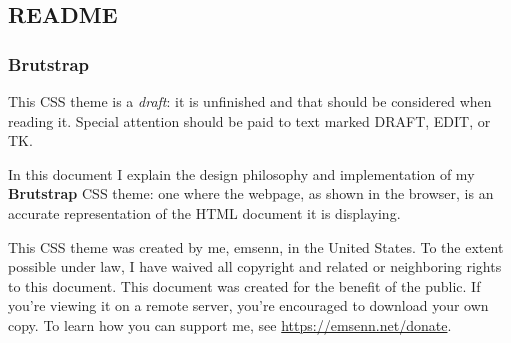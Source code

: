 \documentclass[11pt]{article}
\begin{document}
\subsection*{README}
\label{sec:orge122f29}
\subsubsection*{Brutstrap}
\label{sec:org79aa432}
This CSS theme is a \emph{draft}: it is unfinished and that should be considered when reading it. Special attention should be paid to text marked DRAFT, EDIT, or TK.

In this document I explain the design philosophy and implementation of
my \textbf{Brutstrap} CSS theme: one where the webpage, as shown in the
browser, is an accurate representation of the HTML document it is
displaying.

This CSS theme was created by me, emsenn, in the United States. To the extent possible under law, I have waived all copyright and related or neighboring rights to this document. This document was created for the benefit of the public. If you're viewing it on a remote server, you're encouraged to download your own copy. To learn how you can support me, see \href{https://emsenn.net/donate}{https://emsenn.net/donate}.
\end{document}
